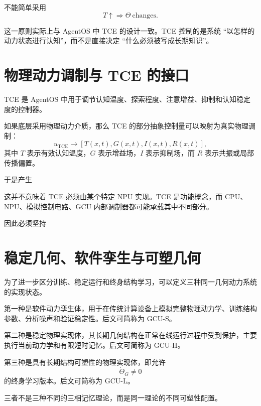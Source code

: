 不能简单采用
\[
T\uparrow
\Rightarrow
\Theta\ \mathrm{changes}.
\]

这一原则实际上与 AgentOS 中 TCE 的设计一致。TCE 控制的是系统 ``以怎样的动力状态进行认知''，而不是直接决定 ``什么必须被写成长期知识''。

\section{物理动力调制与 TCE 的接口}

TCE 是 AgentOS 中用于调节认知温度、探索程度、注意增益、抑制和认知稳定度的控制器。

如果底层采用物理动力介质，那么 TCE 的部分抽象控制量可以映射为真实物理调制：
\[
u_{\mathrm{TCE}}
\rightarrow
[
T(x,t),
G(x,t),
I(x,t),
R(x,t)
],
\]
其中 $T$ 表示有效认知温度，$G$ 表示增益场，$I$ 表示抑制场，而 $R$ 表示共振或局部传播偏置。

于是产生
\begin{statementbox}
\centering
{}
\end{statementbox}

这并不意味着 TCE 必须由某个特定 NPU 实现。TCE 是功能概念，而 CPU、NPU、模拟控制电路、GCU 内部调制器都可能承载其中不同部分。

因此必须坚持
\begin{statementbox}
\centering
{}
\end{statementbox}

\section{稳定几何、软件孪生与可塑几何}

为了进一步区分训练、稳定运行和终身结构学习，可以定义三种同一几何动力系统的实现状态。

第一种是软件动力孪生体，用于在传统计算设备上模拟完整物理动力学、训练结构参数、分析噪声和验证稳定性。后文可简称为 GCU-S。

第二种是稳定物理实现体，其长期几何结构在正常在线运行过程中受到保护，主要执行当前动力学和有限短时记忆。后文可简称为 GCU-H。

第三种是具有长期结构可塑性的物理实现体，即允许
\[
\dot\Theta_G\neq 0
\]
的终身学习版本。后文可简称为 GCU-L。

三者不是三种不同的三相记忆理论，而是同一理论的不同可塑性配置。

